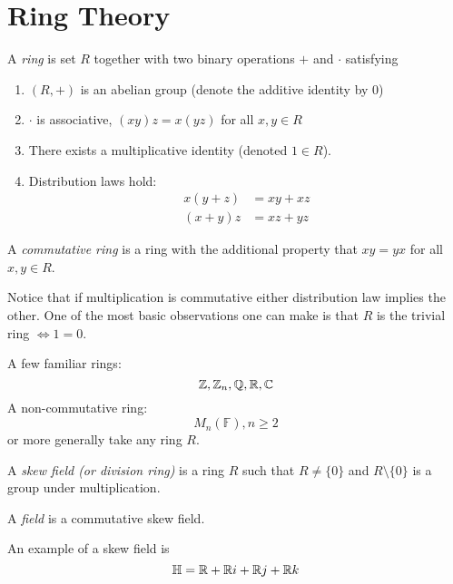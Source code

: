 \documentclass[master.tex]{subfiles}
\begin{document}
\section{Ring Theory}

\newcommand{\F}{\mathbb{F}}


\begin{defn*}
  A \emph{ring} is set \(R\) together with two binary operations \(+\) and \(\cdot\) satisfying
  \begin{enumerate}[label=(\roman*)]
  \item \((R,+)\) is an abelian group (denote the additive identity by \(0\))
  \item \(\cdot\) is associative, \((xy)z=x(yz)\) for all \(x,y \in R\)
  \item There exists a multiplicative identity (denoted \(1 \in R\)).
  \item Distribution laws hold:
    \begin{align*}
      x(y+z) &= xy + xz\\
      (x+y)z &= xz+yz
    \end{align*}
  \end{enumerate}
\end{defn*}

\begin{defn*}
  A \emph{commutative ring} is a ring with the additional property that \(xy=yx\) for all \(x,y \in R\).
\end{defn*}
Notice that if multiplication is commutative either distribution law implies the other. One of the most basic
observations one can make is
that \(R\) is the trivial ring \(\iff 1=0\).

\begin{example*}
  A few familiar rings: \[{\mathbb Z},{\mathbb Z}_n,{\mathbb Q},{\mathbb R},{\mathbb C}\]
  A non-commutative ring:
  \[M_n(\F), n \ge 2\]
  or more generally take any ring \(R\).
\end{example*}

\begin{defn*}
  A \emph{skew field (or division ring)} is a ring \(R\) such that \(R \neq \{0\}\) and \(R \setminus \{0\}\) is a group
  under multiplication.
\end{defn*}

\begin{defn*}
  A \emph{field} is a commutative skew field.
\end{defn*}

\begin{example*}
  An example of a skew field is
  \[{\mathbb H} = {\mathbb R} + {\mathbb R} i + {\mathbb R} j + {\mathbb R} k\]
\end{example*}
\end{document}
